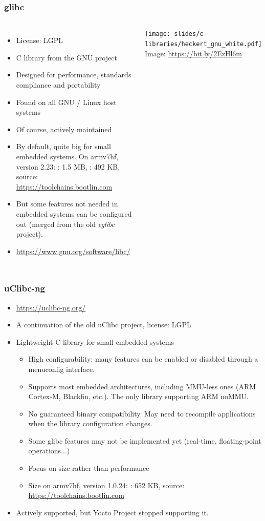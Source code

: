 \begin{frame}
  \frametitle{glibc}
  \begin{columns}
    \begin{itemize}
    \item License: LGPL
    \item C library from the GNU project
    \item Designed for performance, standards compliance and portability
    \item Found on all GNU / Linux host systems
    \item Of course, actively maintained
    \item By default, quite big for small embedded systems.
      On armv7hf, version 2.23: : 1.5 MB, : 492
      KB, source: \url{https://toolchains.bootlin.com}
    \item But some features not needed in embedded systems can be
          configured out (merged from the old {\em eglibc} project).
    \item \url{https://www.gnu.org/software/libc/}
    \end{itemize}
    \vfill
    \minipage[c][0.8\textheight][s]{\columnwidth}
    \texttt{[image: slides/c-libraries/heckert\_gnu\_white.pdf]}
    \vfill
    \tiny Image: \url{https://bit.ly/2EzHl6m}
    \endminipage
  \end{columns}
\end{frame}

\begin{frame}
  \frametitle{uClibc-ng}
  \begin{itemize}
  \item \url{https://uclibc-ng.org/}
  \item A continuation of the old uClibc project, license: LGPL
  \item Lightweight C library for small embedded systems
    \begin{itemize}
    \item High configurability: many features can be enabled or
      disabled through a menuconfig interface.
    \item Supports most embedded architectures, including MMU-less
          ones (ARM Cortex-M, Blackfin, etc.). The only library
          supporting ARM noMMU.
    \item No guaranteed binary compatibility. May need to
      recompile applications when the library configuration changes.
    \item Some glibc features may not be implemented yet (real-time,
          floating-point operations...)
    \item Focus on size rather than performance
    \item Size on armv7hf, version 1.0.24:
      : 652 KB, source: \url{https://toolchains.bootlin.com}
    \end{itemize}
    \item Actively supported, but Yocto Project stopped supporting it.
  \end{itemize}
\end{frame}

